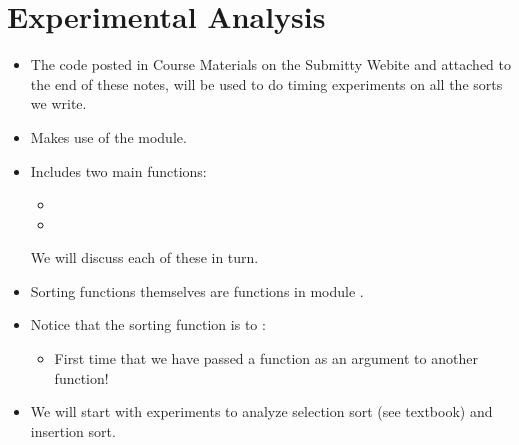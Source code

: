\documentclass[letterpaper,10pt,english]{sphinxmanual}
\begin{document}
\section{Experimental Analysis}
\label{\detokenize{lecture_notes/lec21_sorting:experimental-analysis}}\begin{itemize}
\item {} 
The code  posted in Course Materials on the Submitty Webite and attached to
the end of these notes, will be used to do timing experiments on all
the sorts we write.

\item {} 
Makes use of the  module.

\item {} 
Includes two main functions:
\begin{itemize}
\item {} 

\item {} 

\end{itemize}

We will discuss each of these in turn.

\item {} 
Sorting functions themselves are functions in module .

\item {} 
Notice that the sorting function is  to
:
\begin{itemize}
\item {} 
First time that we have passed a function as an argument to
another function!

\end{itemize}

\item {} 
We will start with experiments to analyze selection sort (see
textbook) and insertion sort.

\end{itemize}
\end{document}

